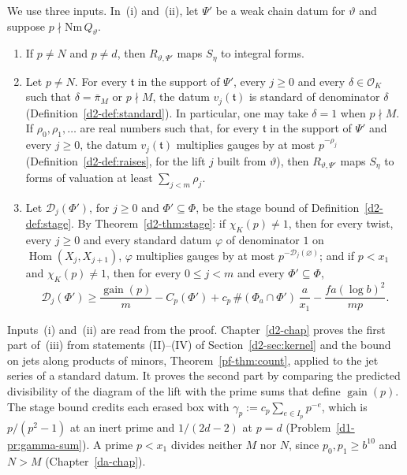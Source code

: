\documentclass[reqno]{amsart}
\newcounter{chap}
\theoremstyle{definition}
\theoremstyle{plain}
\theoremstyle{definition}
\theoremstyle{remark}
\newcommand{\Oc}{\mathcal O}
\newcommand{\gain}{\operatorname{gain}}
\newcommand{\Nm}{\mathrm{Nm}\,}
\newcommand{\Dc}{\mathcal D}
\begin{document}
We use three inputs.  In~(i) and~(ii), let \(\Psi'\) be a weak chain datum for \(\vartheta\) and suppose \(p \nmid \Nm Q_\vartheta\).
\begin{enumerate}
\item[(i)] If \(p \ne N\) and \(p \ne d\), then \(R_{\vartheta,\Psi'}\) maps \(S_\eta\) to integral forms.
\item[(ii)] Let \(p \ne N\).  For every \(\mathfrak t\) in the support of \(\Psi'\), every \(j\ge0\) and every \(\delta\in\Oc_K\) such that \(\delta=\bar\pi_M\) or \(p\nmid M\), the datum \(v_j(\mathfrak t)\) is standard of denominator \(\delta\) (Definition~\ref{d2-def:standard}).  In particular, one may take \(\delta=1\) when \(p\nmid M\).  If \(\rho_0, \rho_1, \dots\) are real numbers such that, for every \(\mathfrak t\) in the support of \(\Psi'\) and every \(j \ge 0\), the datum \(v_j(\mathfrak t)\) multiplies gauges by at most \(p^{-\rho_j}\) (Definition~\ref{d2-def:raises}, for the lift \(j\) built from \(\vartheta\)), then \(R_{\vartheta,\Psi'}\) maps \(S_\eta\) to forms of valuation at least \(\sum_{j<m} \rho_j\).
\item[(iii)] Let \(\Dc_j(\Phi')\), for \(j \ge 0\) and \(\Phi' \subseteq \Phi\), be the stage bound of Definition~\ref{d2-def:stage}.  By Theorem~\ref{d2-thm:stage}: if \(\chi_K(p) \ne 1\), then for every twist, every \(j \ge 0\) and every standard datum \(\varphi\) of denominator \(1\) on \(\operatorname{Hom}(X_j, X_{j+1})\), \(\varphi\) multiplies gauges by at most \(p^{-\Dc_j(\varnothing)}\); and if \(p < x_1\) and \(\chi_K(p) \ne 1\), then for every \(0 \le j < m\) and every \(\Phi' \subseteq \Phi\),
\[
  \Dc_j(\Phi') \ge \frac{\gain(p)}{m} - C_p(\Phi') + c_p\, \#(\Phi_a \cap \Phi')\,\frac{a}{x_1} - \frac{fa(\log b)^2}{mp} .
\]
\end{enumerate}
Inputs~(i) and~(ii) are read from the proof.  Chapter~\ref{d2-chap} proves the first part of~(iii) from statements (II)--(IV) of Section~\ref{d2-sec:kernel} and the bound on jets along products of minors, Theorem~\ref{pf-thm:count}, applied to the jet series of a standard datum.  It proves the second part by comparing the predicted divisibility of the diagram of the lift with the prime sums that define \(\gain(p)\).  The stage bound credits each erased box with \(\gamma_p := c_p\sum_{e \in I_p} p^{-e}\), which is \(p/(p^2 - 1)\) at an inert prime and \(1/(2d - 2)\) at \(p = d\) (Problem~\ref{d1-pr:gamma-sum}).  A prime \(p < x_1\) divides neither \(M\) nor \(N\), since \(p_0, p_1 \ge b^{10}\) and \(N > M\) (Chapter~\ref{da-chap}).
\end{document}
